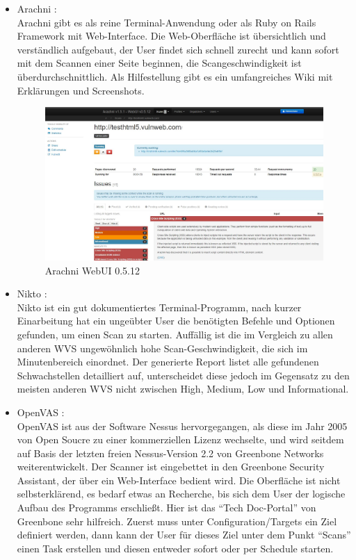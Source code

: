 \documentclass[12pt,oneside,a4paper,parskip]{scrbook}
\begin{document}
        \begin{itemize}
          \item Arachni \cite{Arachni}:\\
            Arachni gibt es als reine Terminal-Anwendung oder als Ruby on Rails Framework mit Web-Interface. Die Web-Oberfläche ist übersichtlich und verständlich aufgebaut, der User findet sich schnell zurecht und kann sofort mit dem Scannen einer Seite beginnen, die Scangeschwindigkeit ist überdurchschnittlich. Als Hilfestellung gibt es ein umfangreiches Wiki mit Erklärungen und Screenshots.
            \begin{figure}[H]
              \includegraphics[width=1\textwidth]{Images/Arachni}
              \caption[Arachni WebUI 0.5.12]{Arachni WebUI 0.5.12}
            \end{figure}
          \item Nikto \cite{Nikto}:\\
            Nikto ist ein gut dokumentiertes Terminal-Programm, nach kurzer Einarbeitung hat ein ungeübter User die benötigten Befehle und Optionen gefunden, um einen Scan zu starten.
            Auffällig ist die im Vergleich zu allen anderen WVS ungewöhnlich hohe Scan-Geschwindigkeit, die sich im Minutenbereich einordnet.
            Der generierte Report listet alle gefundenen Schwachstellen detailliert auf, unterscheidet diese jedoch im Gegensatz zu den meisten anderen WVS nicht zwischen High, Medium, Low und Informational.
          \item OpenVAS \cite{OpenVAS}:\\
            OpenVAS ist aus der Software Nessus hervorgegangen, als diese im Jahr 2005 von Open Soucre zu einer kommerziellen Lizenz wechselte, und wird seitdem auf Basis der letzten freien Nessus-Version 2.2 von Greenbone Networks weiterentwickelt. Der Scanner ist eingebettet in den Greenbone Security Assistant, der über ein Web-Interface bedient wird. Die Oberfläche ist nicht selbsterklärend, es bedarf etwas an Recherche, bis sich dem User der logische Aufbau des Programms erschließt. Hier ist das ``Tech Doc-Portal'' von Greenbone sehr hilfreich. Zuerst muss unter Configuration/Targets ein Ziel definiert werden, dann kann der User für dieses Ziel unter dem Punkt ``Scans'' einen Task erstellen und diesen entweder sofort oder per Schedule starten.

\end{itemize}
\end{document}
